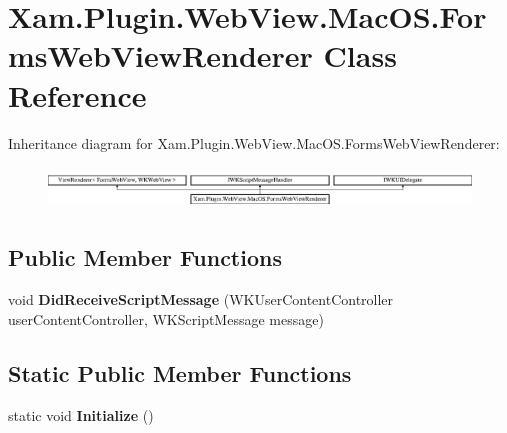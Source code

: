 \hypertarget{class_xam_1_1_plugin_1_1_web_view_1_1_mac_o_s_1_1_forms_web_view_renderer}{}\section{Xam.\+Plugin.\+Web\+View.\+Mac\+O\+S.\+Forms\+Web\+View\+Renderer Class Reference}
\label{class_xam_1_1_plugin_1_1_web_view_1_1_mac_o_s_1_1_forms_web_view_renderer}
Inheritance diagram for Xam.\+Plugin.\+Web\+View.\+Mac\+O\+S.\+Forms\+Web\+View\+Renderer\+:\begin{figure}[H]
\begin{center}
\leavevmode
\includegraphics[height=1.121121cm]{class_xam_1_1_plugin_1_1_web_view_1_1_mac_o_s_1_1_forms_web_view_renderer}
\end{center}
\end{figure}
\subsection*{Public Member Functions}
\begin{DoxyCompactItemize}
\item 
\mbox{\label{class_xam_1_1_plugin_1_1_web_view_1_1_mac_o_s_1_1_forms_web_view_renderer_a5cd342241f16aac535a27b2a4ccd3d23}} 
void {\bfseries Did\+Receive\+Script\+Message} (W\+K\+User\+Content\+Controller user\+Content\+Controller, W\+K\+Script\+Message message)
\end{DoxyCompactItemize}
\subsection*{Static Public Member Functions}
\begin{DoxyCompactItemize}
\item 
\mbox{\label{class_xam_1_1_plugin_1_1_web_view_1_1_mac_o_s_1_1_forms_web_view_renderer_aa800a564b2257d49117c90b5ad03d6e6}} 
static void {\bfseries Initialize} ()
\end{DoxyCompactItemize}
